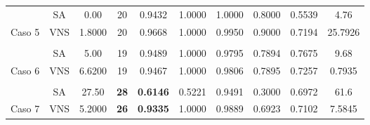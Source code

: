 \begin{table}
{\begin{tabular}{cccccccccc}
			\multicolumn{1}{c|}{}                         & SA  & 0.00                                                                 & 20                                                                 & 0.9432                                                  & 1.0000 & 1.0000 & 0.8000 & 0.5539 & 4.76         \\
			\multicolumn{1}{c|}{\multirow{-2}{*}{Caso 5}} & VNS & 1.8000                                                               & 20                                                                 & 0.9668                                                  & 1.0000 & 0.9950 & 0.9000 & 0.7194 & 25.7926      \\
			&     &                                                                      &                                                                    &                                                         &        &        &        &        &              \\
			\multicolumn{1}{c|}{}                         & SA  & 5.00                                                                 & 19                                                                 & 0.9489                                                  & 1.0000 & 0.9795 & 0.7894 & 0.7675 & 9.68         \\
			\multicolumn{1}{c|}{\multirow{-2}{*}{Caso 6}} & VNS & 6.6200                                                               & 19                                                                 & 0.9467                                                  & 1.0000 & 0.9806 & 0.7895 & 0.7257 & 0.7935       \\
			&     &                                                                      &                                                                    &                                                         &        &        &        &        &              \\
			\multicolumn{1}{c|}{}                         & SA  & 27.50                                                                & {\color[HTML]{9A0000} \textbf{28}}                                 & {\color[HTML]{9A0000} \textbf{0.6146}}                  & 0.5221 & 0.9491 & 0.3000 & 0.6972 & 61.6         \\
			\multicolumn{1}{c|}{\multirow{-2}{*}{Caso 7}} & VNS & 5.2000                                                               & {\color[HTML]{9A0000} \textbf{26}}                                 & {\color[HTML]{9A0000} \textbf{0.9335}}                  & 1.0000 & 0.9889 & 0.6923 & 0.7102 & 7.5845       \\

\end{tabular}}
\end{table}
